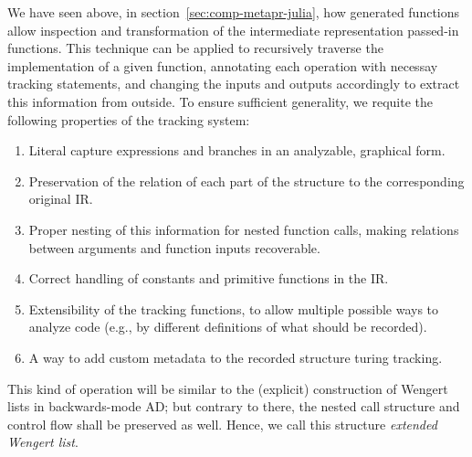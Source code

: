 We have seen above, in section~\ref{sec:comp-metapr-julia}, how generated functions allow inspection
and transformation of the intermediate representation passed-in functions.  This technique can be
applied to recursively traverse the implementation of a given function, annotating each operation
with necessay tracking statements, and changing the inputs and outputs accordingly to extract this
information from outside.  To ensure sufficient generality, we requite the following properties of
the tracking system:
\begin{enumerate}
\item Literal capture expressions and branches in an analyzable, graphical form.
\item Preservation of the relation of each part of the structure to the corresponding original IR.
\item Proper nesting of this information for nested function calls, making relations between
  arguments and function inputs recoverable.
\item Correct handling of constants and primitive functions in the IR.
\item Extensibility of the tracking functions, to allow multiple possible ways to analyze code
  (e.g., by different definitions of what should be recorded).
\item A way to add custom metadata to the recorded structure turing tracking.
\end{enumerate}
This kind of operation will be similar to the (explicit) construction of Wengert lists in
backwards-mode AD; but contrary to there, the nested call structure and control flow shall be
preserved as well.  Hence, we call this structure \emph{extended Wengert list}.



